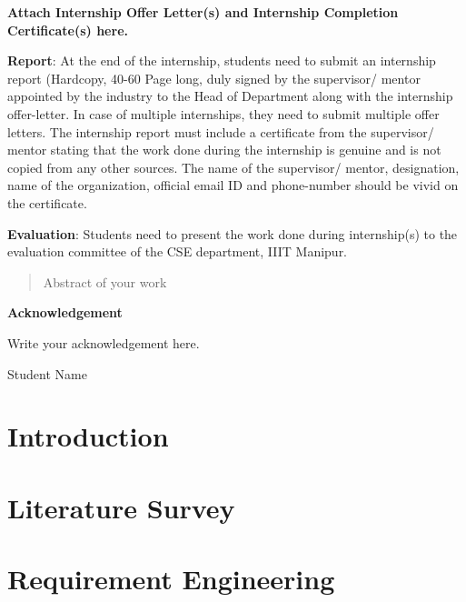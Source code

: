 \documentclass[a4paper, 11pt, oneside]{report}
\begin{document}
	\newpage
\textbf{ Attach Internship Offer Letter(s) and Internship Completion Certificate(s) here.}

        \vspace{1cm}
 \textbf{Report}: At the end of the internship, students need to submit an internship report (Hardcopy, 40-60 Page long, duly signed by the supervisor/
mentor appointed by the industry to the Head of Department along with the internship offer-letter. In case of multiple internships, they need to submit multiple offer letters. The internship report must include a certificate from the supervisor/ mentor stating that the work done during the internship is genuine and is not copied from any other sources. The name of the supervisor/ mentor, designation, name of the organization, official email ID and phone-number should be vivid on the certificate.
   \vspace{1cm}
   
\textbf{Evaluation}: Students need to present the work done during internship(s) to the evaluation committee of the CSE department, IIIT Manipur.
 
		\newpage

\begin{abstract}
	
Abstract of your work

\end{abstract}

\pagebreak
	

        \begin{center}
            { \LARGE \textbf{Acknowledgement}}
        \end{center}
	\vspace{2cm}
	Write your acknowledgement here.
	
	
	\vspace{1cm}
	
	\hspace{7cm}Student Name
	\tableofcontents
	\listoffigures
        \listoftables
	\chapter{Introduction}
	
        \chapter{Literature Survey}
        
        \chapter{Requirement Engineering}
        
\end{document}
